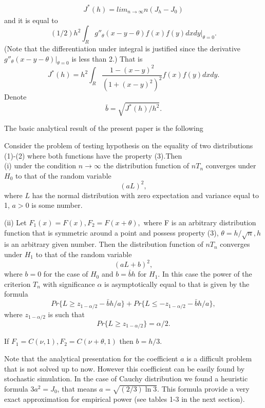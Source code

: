 \documentclass{svproc}
\begin{document}
\begin{eqnarray}
J^*(h)= lim_{n\to \infty} n(J_h - J_0)
\end{eqnarray}
and it is equal to
$$
(1/2)h^2 \int_R g''_\theta(x-y-\theta)f(x)f(y)dxdy|_{\theta=0}.
$$
(Note that the differentiation under integral is justified since the derivative $g ''_\theta(x-y-\theta)|_{\theta=0}$ is less than 2.)
That is
$$
J^*(h)=h^2 \int_R \frac {1-(x-y)^2}{(1+(x-y)^2)^2} f(x)f(y)dxdy.
$$
Denote
$$
\bar b =\sqrt{J^*(h)/h^2}.
$$

The basic analytical result of the present paper is the following
\begin{theorem} Consider the problem of testing hypothesis on the equality of two distributions (1)-(2) where both functions have the property (3).Then\\
(i) under the condition $n \to \infty$
the distribution function of $nT_n$  converges under $H_0$ to that of the random variable
\begin{equation}\label{Distr}
(aL)^2,
\end{equation}
where  $L$ has the normal distribution with zero expectation and variance equal to 1, $a>0$ is some number.

(ii)
Let $F_1(x)= F(x),F_2=F(x+\theta),$
where  F is an arbitrary distribution function that is symmetric around a point and possess property   (3),
$\theta=h/\sqrt{n},h$ is an arbitrary given number. Then
the distribution function of $nT_n$  converges under $H_1$ to that of the random variable
$$
(aL + b)^2,
$$
where $b=0$
for the case of $H_0$ and $b=\bar b h$
for  $H_1$.
In this case the power of the criterion $T_n$ with significance $\alpha$ is asymptotically equal to that is given by the formula
$$
Pr\{L\geq z_{1-\alpha/2}-\bar bh/a\}
+ Pr\{L\leq - z_{1-\alpha/2}-\bar bh/a\},
$$
where $z_{1-\alpha/2}$ is such that
$$
Pr \{L\geq z_{1-\alpha/2}\}= \alpha/2.
$$

If $F_1=C(\nu,1), F_2=C(\nu + \theta,1)$ then $ b= h/3$. 
\end{theorem}
Note that the analytical presentation for the coefficient $a$ is a difficult problem that is not solved up to now. However this coefficient can be easily found by stochastic simulation. In the case of Cauchy distribution we found a heuristic formula $3a^2= J_0$, that means $a =\sqrt{(2/3)\ln3}$. This formula provide a very exact approximation for empirical power (see tables 1-3 in the next section). 
\end{document}
